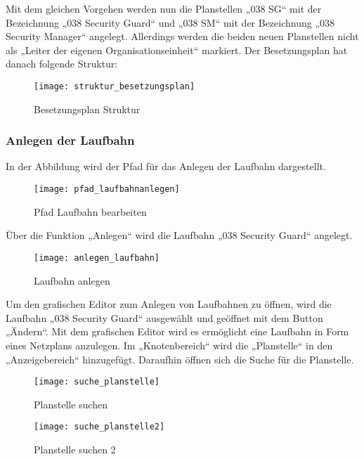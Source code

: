 Mit dem gleichen Vorgehen werden nun die Planstellen „038 SG“ mit der Bezeichnung „038 Security Guard“ und „038 SM“ mit der Bezeichnung „038 Security Manager“ angelegt. Allerdings werden die beiden neuen Planstellen nicht als „Leiter der eigenen Organisationseinheit“ markiert. Der Besetzungsplan hat danach folgende Struktur:

\begin{figure}[H]
	\centering
	\texttt{[image: struktur\_besetzungsplan]}
	\caption{Besetzungsplan Struktur}
	\label{fig:struktur_besetzungsplan}
\end{figure}

\subsubsection{Anlegen der Laufbahn}
In der Abbildung wird der Pfad für das Anlegen der Laufbahn dargestellt.

\begin{figure}[H]
	\centering
	\texttt{[image: pfad\_laufbahnanlegen]}
	\caption{Pfad Laufbahn bearbeiten}
	\label{fig:pfad_laufbahnanlegen}
\end{figure}

Über die Funktion „Anlegen“ wird die Laufbahn „038 Security Guard“ angelegt.

\begin{figure}[H]
	\centering
	\texttt{[image: anlegen\_laufbahn]}
	\caption{Laufbahn anlegen}
	\label{fig:anlegen_laufbahn}
\end{figure}

Um den grafischen Editor zum Anlegen von Laufbahnen zu öffnen, wird die Laufbahn „038 Security Guard“ ausgewählt und geöffnet mit dem Button „Ändern“. Mit dem grafischen Editor wird es ermöglicht eine Laufbahn in Form eines Netzplans anzulegen. Im „Knotenbereich“ wird die „Planstelle“ in den „Anzeigebereich“ hinzugefügt. Daraufhin öffnen sich die Suche für die Planstelle.

\begin{figure}[H]
	\centering
	\texttt{[image: suche\_planstelle]}
	\caption{Planstelle suchen}
	\label{fig:suche_planstelle}
\end{figure}
\begin{figure}[H]
	\centering
	\texttt{[image: suche\_planstelle2]}
	\caption{Planstelle suchen 2}
	\label{fig:suche_planstelle2}
\end{figure}

